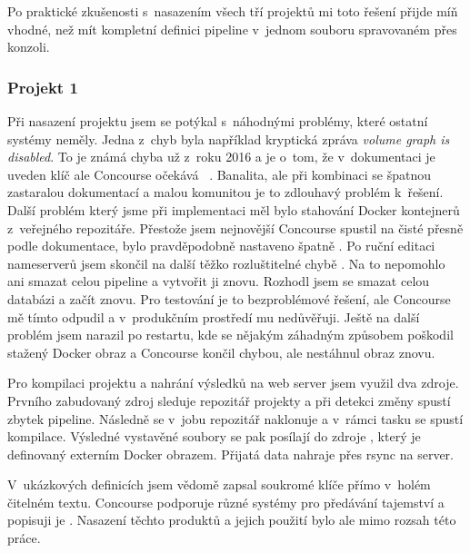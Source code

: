         Po praktické zkušenosti s~nasazením všech tří projektů mi toto řešení přijde míň vhodné, než mít kompletní definici pipeline v~jednom souboru spravovaném přes konzoli.


        \subsubsection{Projekt 1}
            Při nasazení projektu jsem se potýkal s~náhodnými problémy, které ostatní \CI systémy neměly. Jedna z~chyb byla například kryptická zpráva \textit{volume graph is disabled}. To je známá chyba už z~roku 2016 a je o~tom, že v~dokumentaci je uveden klíč  ale Concourse očekává ~\cite{concourse-issue-402}. Banalita, ale při kombinaci se špatnou zastaralou dokumentací a malou komunitou je to zdlouhavý problém k~řešení. Další problém který jsme při implementaci měl bylo stahování Docker kontejnerů z~veřejného repozitáře. Přestože jsem nejnovější Concourse spustil na čisté  přesně podle dokumentace, bylo pravděpodobně nastaveno špatně . Po ruční editaci nameserverů jsem skončil na další těžko rozluštitelné chybě . Na to nepomohlo ani smazat celou pipeline a vytvořit ji znovu. Rozhodl jsem se smazat celou databázi a začít znovu. Pro testování je to bezproblémové řešení, ale Concourse mě tímto odpudil a v~produkčním prostředí mu nedůvěřuji. Ještě na další problém jsem narazil po restartu, kde se nějakým záhadným způsobem poškodil stažený Docker obraz a Concourse končil chybou, ale nestáhnul obraz znovu.

            Pro kompilaci projektu a nahrání výsledků na web server jsem využil dva zdroje. Prvního zabudovaný zdroj  sleduje repozitář projekty a při detekci změny spustí zbytek pipeline. Následně se v~jobu repozitář naklonuje a v~rámci tasku se spustí kompilace. Výsledné vystavěné soubory se pak posílají do zdroje , který je definovaný externím Docker obrazem. Přijatá data nahraje přes rsync na server.

            V~ukázkových definicích jsem vědomě zapsal soukromé klíče přímo v~holém čitelném textu. Concourse podporuje různé systémy pro předávání tajemství a popisuji je . Nasazení těchto produktů a jejich použití bylo ale mimo rozsah této práce.

